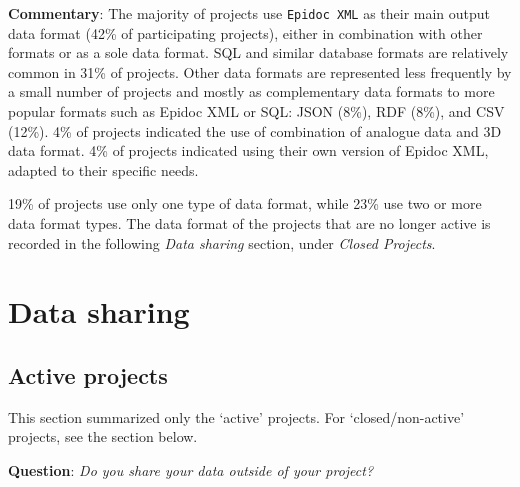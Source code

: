 \documentclass[
  12pt,
]{scrreprt}
\begin{document}
\normalsize

\footnotesize

\normalsize

\textbf{Commentary}: The majority of projects use \texttt{Epidoc\ XML}
as their main output data format (42\% of participating projects),
either in combination with other formats or as a sole data format. SQL
and similar database formats are relatively common in 31\% of projects.
Other data formats are represented less frequently by a small number of
projects and mostly as complementary data formats to more popular
formats such as Epidoc XML or SQL: JSON (8\%), RDF (8\%), and CSV
(12\%). 4\% of projects indicated the use of combination of analogue
data and 3D data format. 4\% of projects indicated using their own
version of Epidoc XML, adapted to their specific needs.

19\% of projects use only one type of data format, while 23\% use two or
more data format types. The data format of the projects that are no
longer active is recorded in the following \emph{Data sharing} section,
under \emph{Closed Projects}.

\hypertarget{data-sharing-1}{%
\section{Data sharing}\label{data-sharing-1}}

\hypertarget{active-projects}{%
\subsection{Active projects}\label{active-projects}}

This section summarized only the `active' projects. For
`closed/non-active' projects, see the section below.

\footnotesize

\normalsize

\textbf{Question}: \emph{Do you share your data outside of your
project?}

\footnotesize
\end{document}
